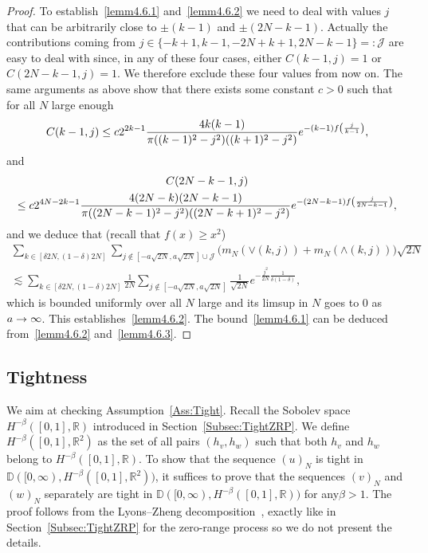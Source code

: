 \documentclass[10pt]{amsart}
\theoremstyle{definition}\newtheorem{defi}[theo]{Definition}\newtheorem{rema}[theo]{Remark}\newtheorem{exam}[theo]{Example}\newtheorem{exem}[theo]{Example}\newtheorem{nota}[theo]{Notation}
\newcommand{\Wedge}{\wedge}\newcommand{\Vee}{\vee}
\theoremstyle{plain}
\newcommand{\bbD}{\mathbb{D}}
\newcommand{\cJ}{\mathcal{J}}
\newcommand{\R}{\mathbb{R}}
\let\originalleft\left
\let\originalright\right
\renewcommand{\left}{\mathopen{}\mathclose\bgroup\originalleft}
\renewcommand{\right}{\aftergroup\egroup\originalright}
\renewcommand*{\to}{\mathchoice{\longrightarrow}{\rightarrow}{\rightarrow}{\rightarrow}}
\begin{document}
\begin{proof}
To establish~\eqref{lemm4.6.1} and~\eqref{lemm4.6.2} we need to deal with values $j$ that can be arbitrarily close to $\pm (k-1)$ and $\pm (2N-k-1)$. Actually the contributions coming from $j\in \{-k+1,k-1,-2N+k+1,2N-k-1\}=:\cJ$ are easy to deal with since, in any of these four cases, either $C(k-1,j)=1$ or $C(2N-k-1,j)=1$. We therefore exclude these four values from now on. The same arguments as above show that there exists some constant $c>0$ such that for all $N$ large enough
\[
C(k-1,j) \le c 2^{2k-1} \frac{4k(k-1)}{\pi ((k-1)^2-j^2)((k+1)^2-j^2)} e^{-(k-1) f\left(\frac{j}{k-1}\right)},
\]
and
\begin{multline*}
C(2N-k-1,j) \\
\le c 2^{4N-2k-1} \frac{4(2N-k)(2N-k-1)}{\pi ((2N-k-1)^2-j^2)((2N-k+1)^2-j^2)} e^{-(2N-k-1) f\left(\frac{j}{2N-k-1}\right)},
\end{multline*}
and we deduce that (recall that $f(x) \ge x^2$)
\begin{multline*}
\sum_{k\in [\delta 2N, (1 - \delta) 2N]} \sum_{j\notin [-a\sqrt{2N}, a\sqrt{2N}]\cup \cJ}\bigl(m_N(\Vee(k,j)) + m_N(\Wedge(k,j))\bigr)\sqrt{2N}\\
\lesssim
\sum_{k\in [\delta 2N, (1 - \delta) 2N]} \frac1{2N}\sum_{j\notin [-a\sqrt{2N}, a\sqrt{2N}]}\frac1{\sqrt{2N}} e^{-\frac{j^2}{2N} \frac{1}{\delta(1-\delta)}},
\end{multline*}
which is bounded uniformly over all $N$ large and its limsup in $N$ goes to $0$ as $a\to\infty$. This establishes~\eqref{lemm4.6.2}. The bound~\eqref{lemm4.6.1} can be deduced from~\eqref{lemm4.6.2} and~\eqref{lemm4.6.3}.
\end{proof}

\subsection{Tightness}

We aim at checking Assumption~\ref{Ass:Tight}. Recall the Sobolev space $H^{-\beta}([0,1],\R)$ introduced in Section~\ref{Subsec:TightZRP}. We define $H^{-\beta}([0,1],\R^2)$ as the set of all pairs $(h_v,h_w)$ such that both $h_v$ and $h_w$ belong to $H^{-\beta}([0,1],\R)$. To show that the sequence $(u)_N$ is tight in $\bbD([0,\infty),H^{-\beta}([0,1],\R^2))$, it suffices to prove that the sequences $(v)_N$ and $(w)_N$ separately are tight in $\bbD([0,\infty),H^{-\beta}([0,1],\R))$ for any$\beta > 1$. The proof follows from the Lyons--Zheng decomposition~\cite{LyonsZheng}, exactly like in Section~\ref{Subsec:TightZRP} for the {zero-range process} so we do not present the details.
\end{document}
